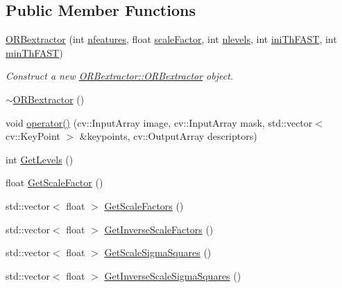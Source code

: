 \subsection*{Public Member Functions}
\begin{DoxyCompactItemize}
\item 
\mbox{\hyperlink{class_o_r_b___s_l_a_m2_1_1_o_r_bextractor_aaa8e010415e516246e171b9bbb9f84af}{O\+R\+Bextractor}} (int \mbox{\hyperlink{class_o_r_b___s_l_a_m2_1_1_o_r_bextractor_ab74b569810b3d3288c642cc48fd65c4c}{nfeatures}}, float \mbox{\hyperlink{class_o_r_b___s_l_a_m2_1_1_o_r_bextractor_a13b9c3883b3fb19cb756f841cb948908}{scale\+Factor}}, int \mbox{\hyperlink{class_o_r_b___s_l_a_m2_1_1_o_r_bextractor_aaf5c435dfb3fb2220c3847cd5f536e2f}{nlevels}}, int \mbox{\hyperlink{class_o_r_b___s_l_a_m2_1_1_o_r_bextractor_a8997b404b50b563ffd2aea6b8130dd2a}{ini\+Th\+F\+A\+ST}}, int \mbox{\hyperlink{class_o_r_b___s_l_a_m2_1_1_o_r_bextractor_a72fcac0df56c0bfe430475082df56823}{min\+Th\+F\+A\+ST}})
\begin{DoxyCompactList}\small\item\em Construct a new \mbox{\hyperlink{class_o_r_b___s_l_a_m2_1_1_o_r_bextractor_aaa8e010415e516246e171b9bbb9f84af}{O\+R\+Bextractor\+::\+O\+R\+Bextractor}} object. \end{DoxyCompactList}\item 
\mbox{\hyperlink{class_o_r_b___s_l_a_m2_1_1_o_r_bextractor_ab0e5801da8f6dee0261aef5cf19e73b3}{$\sim$\+O\+R\+Bextractor}} ()
\item 
void \mbox{\hyperlink{class_o_r_b___s_l_a_m2_1_1_o_r_bextractor_a05117a839e4261638b0413fff2dc9e1b}{operator()}} (cv\+::\+Input\+Array image, cv\+::\+Input\+Array mask, std\+::vector$<$ cv\+::\+Key\+Point $>$ \&keypoints, cv\+::\+Output\+Array descriptors)
\item 
int \mbox{\hyperlink{class_o_r_b___s_l_a_m2_1_1_o_r_bextractor_abaad86a9c65eed8a2f8af9604b1a53ee}{Get\+Levels}} ()
\item 
float \mbox{\hyperlink{class_o_r_b___s_l_a_m2_1_1_o_r_bextractor_a3352294ae4ae250a406140d2ae6f7286}{Get\+Scale\+Factor}} ()
\item 
std\+::vector$<$ float $>$ \mbox{\hyperlink{class_o_r_b___s_l_a_m2_1_1_o_r_bextractor_a977d96ed602e3a6ff036afc2f2f213fd}{Get\+Scale\+Factors}} ()
\item 
std\+::vector$<$ float $>$ \mbox{\hyperlink{class_o_r_b___s_l_a_m2_1_1_o_r_bextractor_aa56b36e338372ec7cba3945c9194da4a}{Get\+Inverse\+Scale\+Factors}} ()
\item 
std\+::vector$<$ float $>$ \mbox{\hyperlink{class_o_r_b___s_l_a_m2_1_1_o_r_bextractor_a8f574b3b1314c5aa645135cb2f3dca3c}{Get\+Scale\+Sigma\+Squares}} ()
\item 
std\+::vector$<$ float $>$ \mbox{\hyperlink{class_o_r_b___s_l_a_m2_1_1_o_r_bextractor_a1ddabdd67709d7df17000cc2966c47c7}{Get\+Inverse\+Scale\+Sigma\+Squares}} ()
\end{DoxyCompactItemize}
